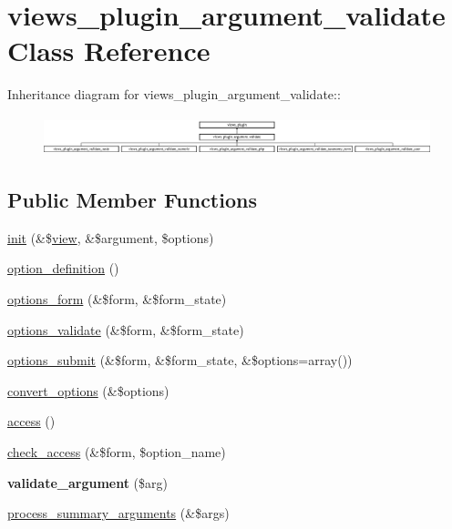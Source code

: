 \hypertarget{classviews__plugin__argument__validate}{
\section{views\_\-plugin\_\-argument\_\-validate Class Reference}
\label{classviews__plugin__argument__validate}
}
Inheritance diagram for views\_\-plugin\_\-argument\_\-validate::\begin{figure}[H]
\begin{center}
\leavevmode
\includegraphics[height=1.14286cm]{classviews__plugin__argument__validate}
\end{center}
\end{figure}
\subsection*{Public Member Functions}
\begin{DoxyCompactItemize}
\item 
\hyperlink{classviews__plugin__argument__validate_a36d63524ce3cc1af5fd8b1e0d56e61ad}{init} (\&\$\hyperlink{classview}{view}, \&\$argument, \$options)
\item 
\hyperlink{classviews__plugin__argument__validate_aebc7a373a95a76ecb64345f558453b2d}{option\_\-definition} ()
\item 
\hyperlink{classviews__plugin__argument__validate_a619aac79800de4535d25fd93ce1f08cc}{options\_\-form} (\&\$form, \&\$form\_\-state)
\item 
\hyperlink{classviews__plugin__argument__validate_a3b9d9986adaf8e1d57d5b1b62ab712b0}{options\_\-validate} (\&\$form, \&\$form\_\-state)
\item 
\hyperlink{classviews__plugin__argument__validate_aff1c9fc15ddc984fb1157f97274e3e6e}{options\_\-submit} (\&\$form, \&\$form\_\-state, \&\$options=array())
\item 
\hyperlink{classviews__plugin__argument__validate_a2de4a9571ea48105e195c483b13f5577}{convert\_\-options} (\&\$options)
\item 
\hyperlink{classviews__plugin__argument__validate_ab90c095a5a91dcf8dfae02dc975d974e}{access} ()
\item 
\hyperlink{classviews__plugin__argument__validate_ae0b2596e21cf8f576a4882bbfd634ccf}{check\_\-access} (\&\$form, \$option\_\-name)
\item 
\hypertarget{classviews__plugin__argument__validate_ae8f4a519d234cbc3d1398f49109b727a}{
{\bfseries validate\_\-argument} (\$arg)}
\label{classviews__plugin__argument__validate_ae8f4a519d234cbc3d1398f49109b727a}

\item 
\hyperlink{classviews__plugin__argument__validate_a35ebaf052ae4653ae5134afc11883c05}{process\_\-summary\_\-arguments} (\&\$args)
\end{DoxyCompactItemize}


